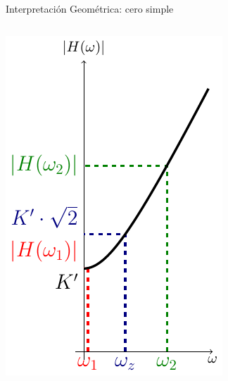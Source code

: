 \documentclass[xcolor={usenames,svgnames,dvipsnames}]{beamer}
\begin{document}
\begin{frame}[label={sec:org0127f75}]{Interpretación Geométrica: cero simple}
\begin{columns}
\begin{column}{0.5\columnwidth}
\begin{center}
\includegraphics[width=.9\linewidth]{../figs/CeroGeometricaPlot.pdf}
\end{center}
\end{column}
\end{columns}
\end{frame}
\end{document}
